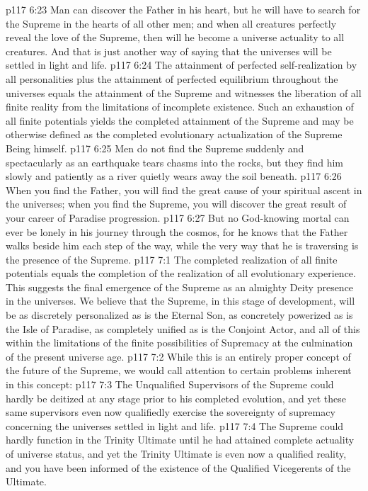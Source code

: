 \vs p117 6:23 Man can discover the Father in his heart, but he will have to search for the Supreme in the hearts of all other men; and when all creatures perfectly reveal the love of the Supreme, then will he become a universe actuality to all creatures. And that is just another way of saying that the universes will be settled in light and life.
\vs p117 6:24 The attainment of perfected self\hyp{}realization by all personalities plus the attainment of perfected equilibrium throughout the universes equals the attainment of the Supreme and witnesses the liberation of all finite reality from the limitations of incomplete existence. Such an exhaustion of all finite potentials yields the completed attainment of the Supreme and may be otherwise defined as the completed evolutionary actualization of the Supreme Being himself.
\pc \vs p117 6:25 Men do not find the Supreme suddenly and spectacularly as an earthquake tears chasms into the rocks, but they find him slowly and patiently as a river quietly wears away the soil beneath.
\vs p117 6:26 When you find the Father, you will find the great cause of your spiritual ascent in the universes; when you find the Supreme, you will discover the great result of your career of Paradise progression.
\vs p117 6:27 But no God\hyp{}knowing mortal can ever be lonely in his journey through the cosmos, for he knows that the Father walks beside him each step of the way, while the very way that he is traversing is the presence of the Supreme.
\vs p117 7:1 The completed realization of all finite potentials equals the completion of the realization of all evolutionary experience. This suggests the final emergence of the Supreme as an almighty Deity presence in the universes. We believe that the Supreme, in this stage of development, will be as discretely personalized as is the Eternal Son, as concretely powerized as is the Isle of Paradise, as completely unified as is the Conjoint Actor, and all of this within the limitations of the finite possibilities of Supremacy at the culmination of the present universe age.
\vs p117 7:2 While this is an entirely proper concept of the future of the Supreme, we would call attention to certain problems inherent in this concept:
\pc \vs p117 7:3 \bibnobreakspace The Unqualified Supervisors of the Supreme could hardly be deitized at any stage prior to his completed evolution, and yet these same supervisors even now qualifiedly exercise the sovereignty of supremacy concerning the universes settled in light and life.\plusone
\pc \vs p117 7:4 \bibnobreakspace The Supreme could hardly function in the Trinity Ultimate until he had attained complete actuality of universe status, and yet the Trinity Ultimate is even now a qualified reality, and you have been informed of the existence of the Qualified Vicegerents of the Ultimate.
